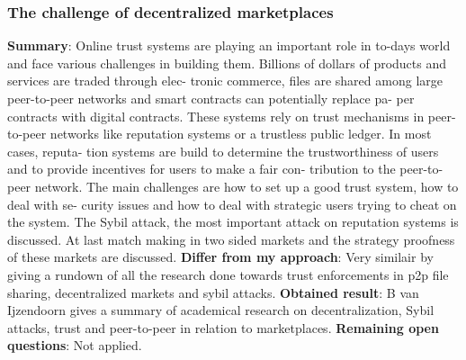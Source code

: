 \subsubsection{The challenge of decentralized marketplaces \cite{challangeDecentralizedMarketplaces}}
\textbf{Summary}: Online trust systems are playing an important role in to-days world and face various challenges in building them. Billions of dollars of products and services are traded through elec- tronic commerce, files are shared among large peer-to-peer networks and smart contracts can potentially replace pa- per contracts with digital contracts. These systems rely on trust mechanisms in peer-to-peer networks like reputation systems or a trustless public ledger. In most cases, reputa- tion systems are build to determine the trustworthiness of users and to provide incentives for users to make a fair con- tribution to the peer-to-peer network. The main challenges are how to set up a good trust system, how to deal with se- curity issues and how to deal with strategic users trying to cheat on the system. The Sybil attack, the most important attack on reputation systems is discussed. At last match making in two sided markets and the strategy proofness of these markets are discussed.\newline
\textbf{Differ from my approach}: Very similair by giving a rundown of all the research done towards trust enforcements in p2p file sharing, decentralized markets and sybil attacks. \newline
\textbf{Obtained result}: B van Ijzendoorn gives a summary of academical research on decentralization, Sybil attacks, trust and peer-to-peer in relation to marketplaces. \newline
\textbf{Remaining open questions}: Not applied.\newline

